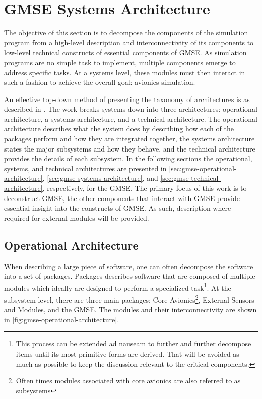 \section{GMSE Systems Architecture}

The objective of this section is to decompose the components of the simulation program from a high-level description and
interconnectivity of its components to low-level technical constructs of essential components of GMSE. As simulation
programs are no simple task to implement, multiple components emerge to address specific tasks. At a systems level,
these modules must then interact in such a fashion to achieve the overall goal: avionics simulation.

An effective top-down method of presenting the taxonomy of architectures is as described in \cite{levis_c4isr_2000}. The
work breaks systems down into three architectures: operational architecture, a systems architecture, and a technical
architecture. The operational architecture describes what the system does by describing how each of the packages perform
and how they are integrated together, the systems architecture states the major subsystems and how they behave, and the
technical architecture provides the details of each subsystem. In the following sections the operational, systems, and
technical architectures are presented in \autoref{sec:gmse-operational-architecture},
\autoref{sec:gmse-systems-architecture}, and \autoref{sec:gmse-technical-architecture}, respectively, for the GMSE. The
primary focus of this work is to deconstruct GMSE, the other components that interact with GMSE provide essential
insight into the constructs of GMSE. As such, description where required for external modules will be provided.

\subsection{Operational Architecture}
\label{sec:gmse-operational-architecture}

When describing a large piece of software, one can often decompose the software into a set of packages. Packages
describes software that are composed of multiple modules which ideally are designed to perform a specialized
task\footnote{This process can be extended ad nauseam to further and further decompose items until its most primitive
forms are derived. That will be avoided as much as possible to keep the discussion relevant to the critical
components.}. At the subsystem level, there are three main packages: Core Avionics\footnote{Often times modules
associated with core avionics are also referred to as subsystems}, External Sensors and Modules, and the GMSE. The
modules and their interconnectivity are shown in \autoref{fig:gmse-operational-architecture}.

